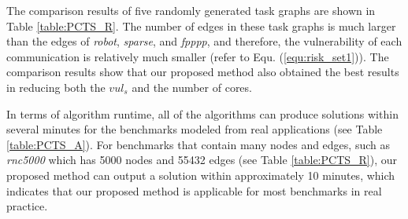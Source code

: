 \documentclass[10pt,journal, compsoc]{IEEEtran}
\begin{document}
The comparison results of five randomly generated task graphs are shown in Table \ref{table:PCTS_R}. The number of edges in these task graphs is much larger than the edges of \textit{robot}, \textit{sparse}, and \textit{fpppp}, and therefore, the vulnerability of each communication is relatively much smaller (refer to Equ. (\ref{equ:risk_set1})). The comparison results show that our proposed method also obtained the best results in reducing both the $vul_s$ and the number of cores.

In terms of algorithm runtime, all of the algorithms can produce solutions within several minutes for the benchmarks modeled from real applications (see Table \ref{table:PCTS_A}). For benchmarks that contain many nodes and edges, such as \textit{rnc5000} which has 5000 nodes and 55432 edges (see Table \ref{table:PCTS_R}), our proposed method can output a solution within approximately 10 minutes, which indicates that our proposed method is applicable for most benchmarks in real practice.
\end{document}
